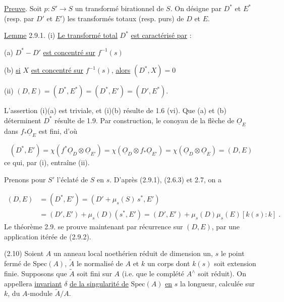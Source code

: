 \underline{Preuve}. Soit $p : S' \longrightarrow S$ un transformé birationnel de $S$. On désigne par $D^*$ et $E^*$ (resp. par $D'$ et $E'$) les transformés totaux (resp. purs) de $D$ et $E$.



\underline{Lemme} 2.9.1. (i) \underline{Le transformé total} $D^*$ \underline{est caractérisé par} :

(a) $D^* - D'$ \underline{est concentré sur} $f^{-1}(s)$

(b) \underline{si} $X$ \underline{est concentré sur} $f^{-1}(s)$, \underline{alors} $(D^*,X) = 0$

(ii) $(D,E) = (D^*,E^*) = (D^*,E') = (D',E^*)$.

L'assertion (i)(a) est triviale, et (i)(b) résulte de 1.6 (vi). Que (a) et (b) déterminent $D^*$ résulte de 1.9. Par construction, le conoyau de la flèche de $\underline{O}_E$ dans $f_* \underline{O}_E$ est fini, d'où

\begin{equation*}
(D^*,E') = \chi(f^*\underline{O}_D \otimes \underline{O}_{E'}) = \chi(\underline{O}_D \otimes f_* \underline{O}_{E'}) = \chi(\underline{O}_D \otimes \underline{O}_E) = (D,E)
\end{equation*}
ce qui, par (i), entraîne (ii).

Prenons pour $S'$ l'éclaté de $S$ en $s$. D'après (2.9.1), (2.6.3) et 2.7, on a

\begin{equation}\tag{2.9.2}
\begin{aligned} (D,E) &= (D^*,E') = (D' + \mu_s(S)\, s^*,E')\\ &= (D',E') + \mu_s(D)(s^*,E') = (D',E') + \mu_s(D)\mu_s(E)[k(s):k] \;. \end{aligned}
\end{equation}
Le théorème 2.9. se prouve maintenant par récurrence sur $(D,E)$, par une application itérée de (2.9.2).

(2.10) Soient $A$ un anneau local noethérien réduit de dimension un, $s$ le point fermé de $\mathrm{Spec}(A)$, $\tilde{A}$ le normalisé de $A$ et $k$ un corps dont $k(s)$ soit extension finie. Supposons que $\tilde{A}$ soit fini sur $A$ (i.e. que le complété $A^{\wedge}$ soit réduit). On appellera \underline{invariant} $\delta$ \underline{de la singularité de} $\mathrm{Spec}(A)$ \underline{en} $s$ la longueur, calculée sur $k$, du $A$-module $\tilde{A}/A$.



